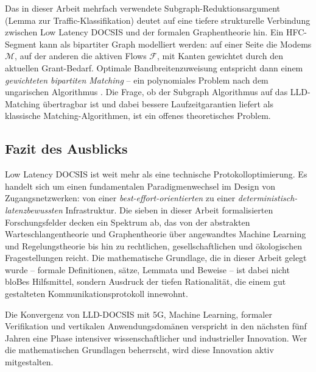 ﻿\documentclass[a4paper,12pt]{article}
\theoremstyle{definition}
\begin{document}
Das in dieser Arbeit mehrfach verwendete Subgraph-Reduktionsargument
(Lemma zur Traffic-Klassifikation) deutet auf eine tiefere strukturelle
Verbindung zwischen Low Latency DOCSIS und der formalen Graphentheorie hin.
Ein HFC-Segment kann als bipartiter Graph modelliert werden: auf einer Seite
die Modems $\mathcal{M}$, auf der anderen die aktiven Flows $\mathcal{F}$,
mit Kanten gewichtet durch den aktuellen Grant-Bedarf. Optimale
Bandbreitenzuweisung entspricht dann einem \emph{gewichteten bipartiten
Matching} -- ein polynomiales Problem nach dem ungarischen Algorithmus
\cite{kuhn1955hungarian}. Die Frage, ob der Subgraph Algorithmus
\cite{epp2026subgraph} auf das LLD-Matching \"{u}bertragbar ist und dabei
bessere Laufzeitgarantien liefert als klassische Matching-Algorithmen,
ist ein offenes theoretisches Problem.

\subsection{Fazit des Ausblicks}

Low Latency DOCSIS ist weit mehr als eine technische Protokolloptimierung.
Es handelt sich um einen fundamentalen Paradigmenwechsel im Design von
Zugangsnetzwerken: von einer \emph{best-effort-orientierten} zu einer
\emph{deterministisch-latenzbewussten} Infrastruktur. Die sieben in dieser
Arbeit formalisierten Forschungsfelder decken ein Spektrum ab, das von der
abstrakten Warteschlangentheorie und Graphentheorie \"{u}ber angewandtes
Machine Learning und Regelungstheorie bis hin zu rechtlichen, gesellschaftlichen
und \"{o}kologischen Fragestellungen reicht. Die mathematische Grundlage, die in
dieser Arbeit gelegt wurde -- formale Definitionen, s\"{a}tze, Lemmata und Beweise
-- ist dabei nicht bloBes Hilfsmittel, sondern Ausdruck der tiefen Rationalit\"{a}t,
die einem gut gestalteten Kommunikationsprotokoll innewohnt.

Die Konvergenz von LLD-DOCSIS mit 5G, Machine Learning, formaler Verifikation
und vertikalen Anwendungsdom\"{a}nen verspricht in den n\"{a}chsten f\"{u}nf Jahren
eine Phase intensiver wissenschaftlicher und industrieller Innovation. Wer
die mathematischen Grundlagen beherrscht, wird diese Innovation aktiv mitgestalten.
\end{document}
